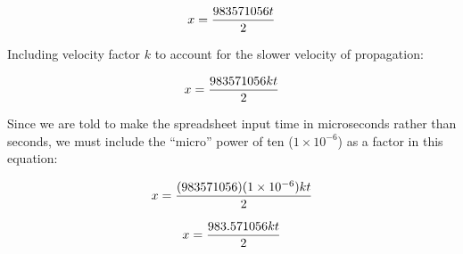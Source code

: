 $$x = {983571056 t \over 2}$$

Including velocity factor $k$ to account for the slower velocity of propagation:

$$x = {983571056 kt \over 2}$$

Since we are told to make the spreadsheet input time in microseconds rather than seconds, we must include the ``micro'' power of ten ($1 \times 10^{-6}$) as a factor in this equation:

$$x = {(983571056)(1 \times 10^{-6}) kt \over 2}$$

$$x = {983.571056 kt \over 2}$$




